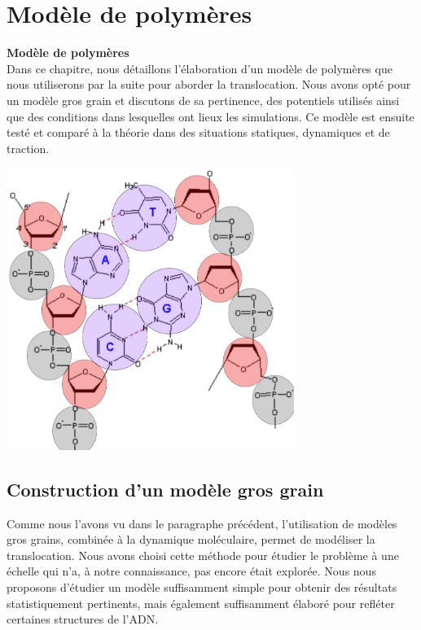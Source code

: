 
\chapter{Modèle de polymères}
\label{polymerevalidation}

\cleardoublepage

{\Large\textbf{{Modèle de polymères}}}\\

\lettrine[loversize=0.6,lraise=0.1,findent=0.5em,nindent=0em]{D}{}ans ce chapitre, nous détaillons l'élaboration d'un modèle de polymères que nous utiliserons par la suite pour aborder la translocation. Nous avons opté pour un modèle gros grain et discutons de sa pertinence, des potentiels utilisés ainsi que des conditions dans lesquelles ont lieux les simulations. Ce modèle est ensuite testé et comparé à la théorie dans des situations statiques, dynamiques et de traction.\\

\minitoc

\begin{center}
\includegraphics[width=0.7\textwidth]{coarsegraining.png}
\end{center}

\cleardoublepage







\section{Construction d'un modèle gros grain}

Comme nous l'avons vu dans le paragraphe précédent, l'utilisation de modèles gros grains, combinée à la dynamique moléculaire, permet de modéliser la translocation. Nous avons choisi cette méthode pour étudier le problème à une échelle qui n'a, à notre connaissance, pas encore était explorée. Nous nous proposons d'étudier un modèle suffisamment simple pour obtenir des résultats statistiquement pertinents, mais également suffisamment élaboré pour refléter certaines structures de l'ADN.

